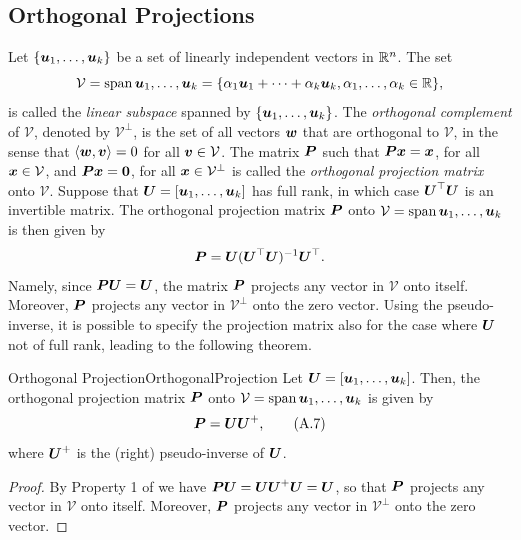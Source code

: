 \subsection{Orthogonal Projections}
Let \(\{\boldsymbol{u}_1, \dots, \boldsymbol{u}_k\}\) be a set of linearly independent vectors in \(\mathbb{R}^n\). The set
\begin{equation*}
	\mathcal{V} = \operatorname{span}{\boldsymbol{u}_1, \dots, \boldsymbol{u}_k} = \{\alpha_1 \boldsymbol{u}_1 + \dots + \alpha_k \boldsymbol{u}_k, \alpha_1, \dots, \alpha_k \in \mathbb{R}\},
\end{equation*}
is called the \textit{linear subspace} spanned by \(\{\boldsymbol{u}_1, \dots, \boldsymbol{u}_k\}\). The \textit{orthogonal complement} of \(\mathcal{V}\), denoted by \(\mathcal{V}^\perp\), is the set of all vectors \(\boldsymbol{w}\) that are orthogonal to \(\mathcal{V}\), in the sense that \(\langle \boldsymbol{w}, \boldsymbol{v} \rangle = 0\) for all \(\boldsymbol{v} \in \mathcal{V}\). The matrix \(\boldsymbol{P}\) such that \(\boldsymbol{Px} = \boldsymbol{x}\), for all \(\boldsymbol{x} \in \mathcal{V}\), and \(\boldsymbol{Px} = \boldsymbol{0}\), for all \(\boldsymbol{x} \in \mathcal{V}^\perp\) is called the \textit{orthogonal projection matrix} onto \(\mathcal{V}\). Suppose that \(\boldsymbol{U} = [\boldsymbol{u}_1, \dots, \boldsymbol{u}_k]\) has full rank, in which case \(\boldsymbol{U}^\top \boldsymbol{U}\) is an invertible matrix. The orthogonal projection matrix \(\boldsymbol{P}\) onto \(\mathcal{V} = \operatorname{span}{\boldsymbol{u}_1, \dots, \boldsymbol{u}_k}\) is then given by
\begin{equation*}
	\boldsymbol{P} = \boldsymbol{U}(\boldsymbol{U}^\top \boldsymbol{U})^{-1}\boldsymbol{U}^\top.
\end{equation*}
Namely, since \(\boldsymbol{PU} = \boldsymbol{U}\), the matrix \(\boldsymbol{P}\) projects any vector in \(\mathcal{V}\) onto itself. Moreover, \(\boldsymbol{P}\) projects any vector in \(\mathcal{V}^\perp\) onto the zero vector. Using the pseudo-inverse, it is possible to specify the projection matrix also for the case where \(\boldsymbol{U}\) not of full rank, leading to the following theorem.

\begin{thm}{Orthogonal Projection}{OrthogonalProjection}
	Let \(\boldsymbol{U} = [\boldsymbol{u}_1, \dots, \boldsymbol{u}_k]\). Then, the orthogonal projection matrix \(\boldsymbol{P}\) onto \(\mathcal{V} = \operatorname{span}{\boldsymbol{u}_1, \dots, \boldsymbol{u}_k}\) is given by
	\begin{equation}
		\boldsymbol{P} = \boldsymbol{U} \boldsymbol{U}^+, \tag{A.7}
	\end{equation}
	where \(\boldsymbol{U}^+\) is the (right) pseudo-inverse of \(\boldsymbol{U}\).
\end{thm}

\begin{proof}
	By Property 1 of  we have \(\boldsymbol{PU} = \boldsymbol{U U}^+ \boldsymbol{U} = \boldsymbol{U}\), so that \(\boldsymbol{P}\) projects any vector in \(\mathcal{V}\) onto itself. Moreover, \(\boldsymbol{P}\) projects any vector in \(\mathcal{V}^\perp\) onto the zero vector.
\end{proof}

